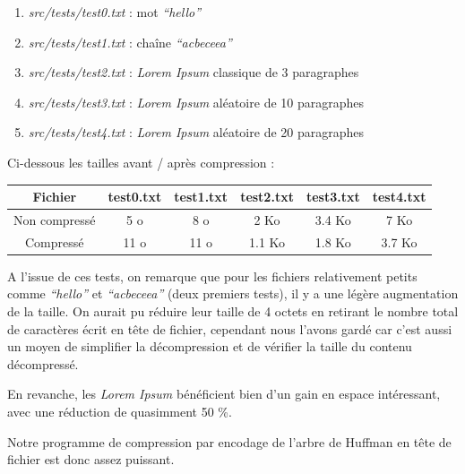 \documentclass [a4paper,11pt] {report}
\begin{document}
\begin{enumerate}

\item%
\textit{src/tests/test0.txt} : mot \textit{``hello''}

\item%
\textit{src/tests/test1.txt} : chaîne \textit{``acbeceea''}

\item%
\textit{src/tests/test2.txt} : \textit{Lorem Ipsum} classique de 3 paragraphes

\item%
\textit{src/tests/test3.txt} : \textit{Lorem Ipsum} aléatoire de 10 paragraphes

\item%
\textit{src/tests/test4.txt} : \textit{Lorem Ipsum} aléatoire de 20 paragraphes

\end{enumerate}
\vspace{0.5cm}

Ci-dessous les tailles avant / après compression :
\begin{center}
\begin{tabular}{|c|c|c|c|c|c|}
 \hline
Fichier & test0.txt & test1.txt & test2.txt & test3.txt & test4.txt\\
 \hline
Non compressé & 5 o & 8 o & 2 Ko & 3.4 Ko & 7 Ko\\
Compressé & 11 o & 11 o & 1.1 Ko & 1.8 Ko & 3.7 Ko\\
 \hline
\end{tabular}
\end{center}

\newpage

A l'issue de ces tests, on remarque que pour les fichiers relativement petits comme \textit{``hello''} et \textit{``acbeceea''} (deux premiers tests), il y a une légère augmentation de la taille. On aurait pu réduire leur taille de 4 octets en retirant le nombre total de caractères écrit en tête de fichier, cependant nous l'avons gardé car c'est aussi un moyen de simplifier la décompression et de vérifier la taille du contenu décompressé.

En revanche, les \textit{Lorem Ipsum} bénéficient bien d'un gain en espace intéressant, avec une réduction de quasimment 50 \%.

Notre programme de compression par encodage de l'arbre de Huffman en tête de fichier est donc assez puissant.
\end{document}
